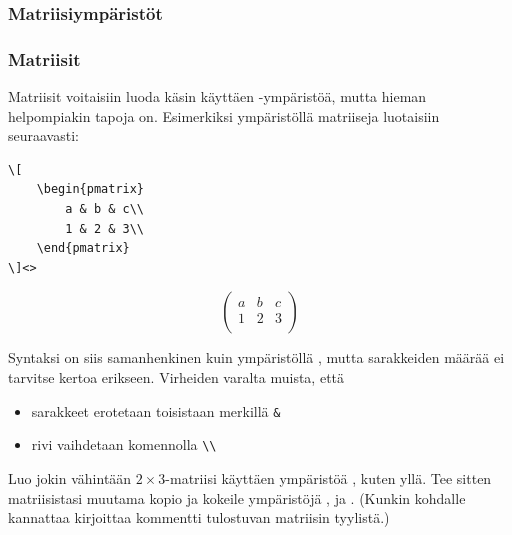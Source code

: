 \subsubsection{Matriisiympäristöt}
\begin{fframe}
    \frametitle{Matriisit}
    Matriisit voitaisiin luoda käsin käyttäen -ympäristöä, mutta hieman helpompiakin tapoja on. Esimerkiksi ympäristöllä  matriiseja luotaisiin seuraavasti:

    \begin{minipage}{5cm}
        \begin{lstlisting}
\[
    \begin{pmatrix}
        a & b & c\\
        1 & 2 & 3\\
    \end{pmatrix}
\]<>
        \end{lstlisting}
    \end{minipage}
    \begin{minipage}{5cm}
        \[
            \begin{pmatrix}
                a & b & c\\
                1 & 2 & 3\\
            \end{pmatrix}
        \]
    \end{minipage}

    \pause
    Syntaksi on siis samanhenkinen kuin ympäristöllä , mutta sarakkeiden määrää ei tarvitse kertoa erikseen. Virheiden varalta muista, että
    \begin{itemize}
        \item sarakkeet erotetaan toisistaan merkillä \lstinline-&-
        \item rivi vaihdetaan komennolla \lstinline-\\-
    \end{itemize}

\end{fframe}

\begin{fframe}
    \begin{harj}
        Luo jokin vähintään \(2\times 3\)-matriisi käyttäen ympäristöä , kuten yllä. Tee sitten matriisistasi muutama kopio ja kokeile ympäristöjä ,  ja . (Kunkin kohdalle kannattaa kirjoittaa kommentti tulostuvan matriisin tyylistä.)
    \end{harj}
\end{fframe}

